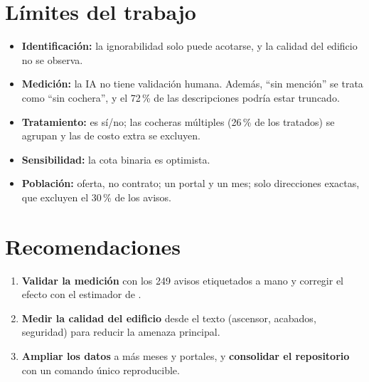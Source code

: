 \section{Límites del trabajo}\label{sec:limites}

\begin{itemize}[leftmargin=*,itemsep=1pt]
\item \textbf{Identificación:} la ignorabilidad solo puede acotarse, y la calidad del edificio no se observa.
\item \textbf{Medición:} la IA no tiene validación humana. Además, ``sin mención'' se trata como ``sin cochera'', y el 72\,\% de las descripciones podría estar truncado.
\item \textbf{Tratamiento:} es sí/no; las cocheras múltiples (26\,\% de los tratados) se agrupan y las de costo extra se excluyen.
\item \textbf{Sensibilidad:} la cota binaria es optimista.
\item \textbf{Población:} oferta, no contrato; un portal y un mes; solo direcciones exactas, que excluyen el 30\,\% de los avisos.
\end{itemize}

\section{Recomendaciones}

\begin{enumerate}[itemsep=1pt]
\item \textbf{Validar la medición} con los 249 avisos etiquetados a mano y corregir el efecto con el estimador de \citet{egami2023}.
\item \textbf{Medir la calidad del edificio} desde el texto (ascensor, acabados, seguridad) para reducir la amenaza principal.
\item \textbf{Ampliar los datos} a más meses y portales, y \textbf{consolidar el repositorio} con un comando único reproducible.
\end{enumerate}
